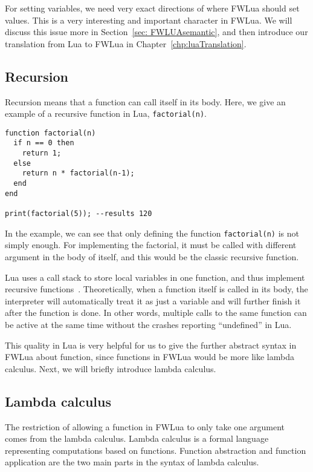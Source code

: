 For setting variables, we need very exact directions of where FWLua should set values. This is a very interesting and important character in FWLua. We will discuss this issue more in Section~\ref{sec: FWLUAsemantic}, and then introduce our translation from Lua to FWLua in Chapter~\ref{chp:luaTranslation}.

\subsection{Recursion}\label{sec:recursions}

Recursion means that a function can call itself in its body.
Here, we give an example of a recursive function in Lua, {\tt factorial(n)}.

\newpage

\begin{verbatim}
function factorial(n)
  if n == 0 then
    return 1;
  else
    return n * factorial(n-1);
  end
end

print(factorial(5)); --results 120
\end{verbatim}

In the example, we can see that only defining the function {\tt factorial(n)} is not simply enough. For implementing the factorial, it must be called with different argument in the body of itself, and this would be the classic recursive function.

Lua uses a call stack to store local variables in one function, and thus implement recursive functions~\cite{begLua}. Theoretically, when a function itself is called in its body, the interpreter will automatically treat it as just a variable and will further finish it after the function is done. In other words, multiple calls to the same function can be active at the same time without the crashes reporting ``undefined'' in Lua.

This quality in Lua is very helpful for us to give the further abstract syntax in FWLua about function, since functions in FWLua would be more like lambda calculus. Next, we will briefly introduce lambda calculus.

\subsection{Lambda calculus}
The restriction of allowing a function in FWLua to only take one argument comes from the lambda calculus. Lambda calculus is a formal language representing computations based on functions. Function abstraction and function application are the two main parts in the syntax of lambda calculus. 

